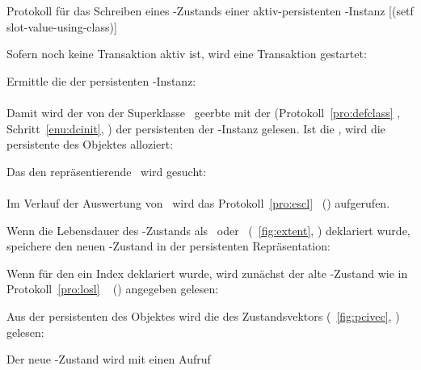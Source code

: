 \begin{infol}
%
\acaption%
 {{Protokoll f\"{u}r das Schreiben eines \protect\Slt\/-Zustands einer
   aktiv-persistenten \clos-Instanz}}%
 [(setf slot-value-using-class)]\label{pro:stsl}%
%
\item\label{enu:stsltr} Sofern noch keine Transaktion aktiv ist, wird
eine Transaktion gestartet:\\
%
\item Ermittle die \sobjid\/ der persistenten \clos-Instanz:\\
\\
Damit wird der von der Superklasse
\ geerbte
\Slt\/ mit der \sobjid\/ (Protokoll~\ref{pro:defclass}
, Schritt~\ref{enu:dcinit},
\citepage{\pageref{enu:dcinit}}) der persistenten \representation{} der
\clos-Instanz gelesen. Ist die \sobjid\/ \lispnil, wird die
persistente \representation{} des Objektes alloziert:\\
%
\item Das den \Slt\/ repr\"{a}sentierende \sltdo\ wird gesucht:\\
\\
Im Verlauf der Auswertung von
\ wird das
Protokoll~\ref{pro:escl}
\stfn{\enscldescr}\ (\citepage{\pageref{pro:escl}}) aufgerufen.
%
\item Wenn die Lebensdauer des \Slt\/-Zustands als
\ oder
\ (\figurename~\ref{fig:extent},
\citepage{\pageref{fig:extent}}) deklariert wurde, speichere den
neuen \Slt\/-Zustand in der persistenten Repr\"{a}sentation:
%
\begin{block}
%
\item\label{enu:stslov} Wenn f\"{u}r den \Slt\/ ein Index deklariert
wurde, wird zun\"{a}chst der alte \Slt\/-Zustand wie in
Protokoll~\ref{pro:losl} \ %
(\citepage{\pageref{pro:losl}}) angegeben
gelesen:\\
%
\item Aus der persistenten \representation{} des Objektes wird die
\sobjid\/ des Zustandsvektors (\figurename~\ref{fig:pcivec},
\citepage{\pageref{fig:pcivec}}) gelesen:\\
%
\item\label{enu:stslnv} Der neue \Slt\/-Zustand wird mit einen Aufruf

\end{block}
\end{infol}
